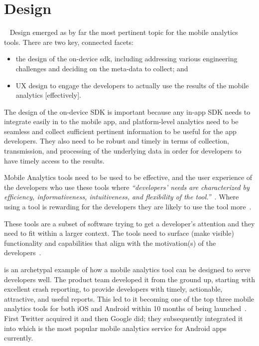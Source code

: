 \section{Design}~\label{tata-design-section}
Design emerged as by far the most pertinent topic for the mobile analytics tools. There are two key, connected facets: 


\begin{itemize}
\item the design of the on-device \Gls{sdk}, including addressing various engineering challenges and deciding on the meta-data to collect; and 
\item UX design to engage the developers to actually use the results of the mobile analytics [effectively].
\end{itemize}

The design of the on-device SDK is important because any in-app SDK needs to integrate easily in to the mobile app, and platform-level analytics need to be seamless and collect sufficient pertinent information to be useful for the app developers. They also need to be robust and timely in terms of collection, transmission, and processing of the underlying data in order for developers to have timely access to the results.

Mobile Analytics tools need to be used to be effective, and the user experience of the developers who use these tools where \emph{``developers’ needs are characterized by efficiency, informativeness, intuitiveness, and flexibility of the tool.''}~. Where using a tool is rewarding for the developers they are likely to use the tool more~.

These tools are a subset of software trying to get a developer's attention and they need to fit within a larger context. The tools need to surface (make visible) functionality and capabilities that align with the motivation(s) of the developers~.

 is an archetypal example of how a mobile analytics tool can be designed to serve developers well. The product team developed it from the ground up, starting with excellent crash reporting, to provide developers with timely, actionable, attractive, and useful reports. This led to it becoming one of the top three mobile analytics tools for both iOS and Android within 10 months of being launched~. %
First Twitter acquired it and then Google did; they subsequently integrated it into  which is the most popular mobile analytics service for Android apps currently. 

